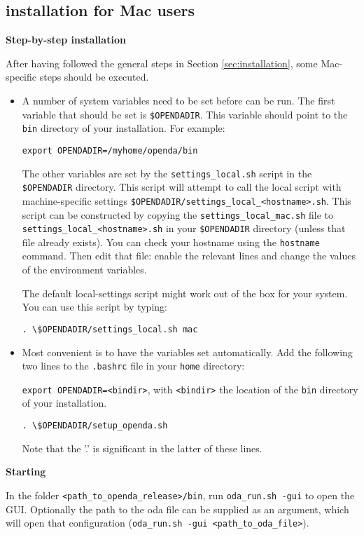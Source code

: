 \subsection{\oda installation for Mac users}
\textbf{Step-by-step installation}

After having followed the general steps in Section \ref{sec:installation}, some Mac-specific steps should be executed.
\begin{itemize}
\item A number of system variables need to be set before \oda can be run. The first variable that should be set is \verb|$OPENDADIR|. This variable should point to the \verb|bin| directory of your \oda installation. For example:

\verb|export OPENDADIR=/myhome/openda/bin|

The other variables are set by the \verb|settings_local.sh| script in the \verb|$OPENDADIR| directory. This script will attempt to call the local script with machine-specific settings \verb|$OPENDADIR/settings_local_<hostname>.sh|. This script can be constructed by copying the \verb|settings_local_mac.sh| file to \verb|settings_local_<hostname>.sh| in your \verb|$OPENDADIR| directory (unless that file already exists). You can check your hostname using the \verb|hostname| command. Then edit that file: enable the relevant lines and change the values of the environment variables.

The default local-settings script might work out of the box for your system. You can use this script by typing:

\verb|. \$OPENDADIR/settings_local.sh mac|
\item Most convenient is to have the variables set automatically. Add the following two lines to the \verb|.bashrc| file in your \verb|home| directory:

\verb|export OPENDADIR=<bindir>|, with \verb|<bindir>| the location of the \verb|bin| directory of your \oda installation.

\verb|. \$OPENDADIR/setup_openda.sh|

Note that the '.' is significant in the latter of these lines.
\end{itemize}

\textbf{Starting \oda}

In the folder \verb|<path_to_openda_release>/bin|, run \verb|oda_run.sh -gui| to open the \oda GUI. Optionally the path to the oda file can be supplied as an argument, which will open that \oda configuration (\verb|oda_run.sh -gui <path_to_oda_file>|).
